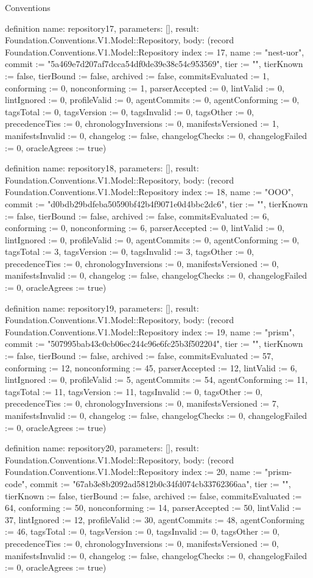 \begin{lexlean}{Conventions}
\begin{semanticmodule}
definition{
  name: repository17,
  parameters: [],
  result: Foundation.Conventions.V1.Model::Repository,
  body: (record Foundation.Conventions.V1.Model::Repository {index := 17, name := "nest-uor", commit := "5a469e7d207af7dcca54df0de39e38c54c953569", tier := "", tierKnown := false, tierBound := false, archived := false, commitsEvaluated := 1, conforming := 0, nonconforming := 1, parserAccepted := 0, lintValid := 0, lintIgnored := 0, profileValid := 0, agentCommits := 0, agentConforming := 0, tagsTotal := 0, tagsVersion := 0, tagsInvalid := 0, tagsOther := 0, precedenceTies := 0, chronologyInversions := 0, manifestsVersioned := 1, manifestsInvalid := 0, changelog := false, changelogChecks := 0, changelogFailed := 0, oracleAgrees := true})
}

definition{
  name: repository18,
  parameters: [],
  result: Foundation.Conventions.V1.Model::Repository,
  body: (record Foundation.Conventions.V1.Model::Repository {index := 18, name := "OOO", commit := "d0bdb29bdfeba50590bf42b4f9071e0d4bbc2dc6", tier := "", tierKnown := false, tierBound := false, archived := false, commitsEvaluated := 6, conforming := 0, nonconforming := 6, parserAccepted := 0, lintValid := 0, lintIgnored := 0, profileValid := 0, agentCommits := 0, agentConforming := 0, tagsTotal := 3, tagsVersion := 0, tagsInvalid := 3, tagsOther := 0, precedenceTies := 0, chronologyInversions := 0, manifestsVersioned := 0, manifestsInvalid := 0, changelog := false, changelogChecks := 0, changelogFailed := 0, oracleAgrees := true})
}

definition{
  name: repository19,
  parameters: [],
  result: Foundation.Conventions.V1.Model::Repository,
  body: (record Foundation.Conventions.V1.Model::Repository {index := 19, name := "prism", commit := "507995bab43c0cb06ec244c96e6fc25b3f502204", tier := "", tierKnown := false, tierBound := false, archived := false, commitsEvaluated := 57, conforming := 12, nonconforming := 45, parserAccepted := 12, lintValid := 6, lintIgnored := 0, profileValid := 5, agentCommits := 54, agentConforming := 11, tagsTotal := 11, tagsVersion := 11, tagsInvalid := 0, tagsOther := 0, precedenceTies := 0, chronologyInversions := 0, manifestsVersioned := 7, manifestsInvalid := 0, changelog := false, changelogChecks := 0, changelogFailed := 0, oracleAgrees := true})
}

definition{
  name: repository20,
  parameters: [],
  result: Foundation.Conventions.V1.Model::Repository,
  body: (record Foundation.Conventions.V1.Model::Repository {index := 20, name := "prism-code", commit := "67ab3e8b2092ad5812b0c34fd074cb33762366aa", tier := "", tierKnown := false, tierBound := false, archived := false, commitsEvaluated := 64, conforming := 50, nonconforming := 14, parserAccepted := 50, lintValid := 37, lintIgnored := 12, profileValid := 30, agentCommits := 48, agentConforming := 46, tagsTotal := 0, tagsVersion := 0, tagsInvalid := 0, tagsOther := 0, precedenceTies := 0, chronologyInversions := 0, manifestsVersioned := 0, manifestsInvalid := 0, changelog := false, changelogChecks := 0, changelogFailed := 0, oracleAgrees := true})
}


\end{semanticmodule}
\end{lexlean}
